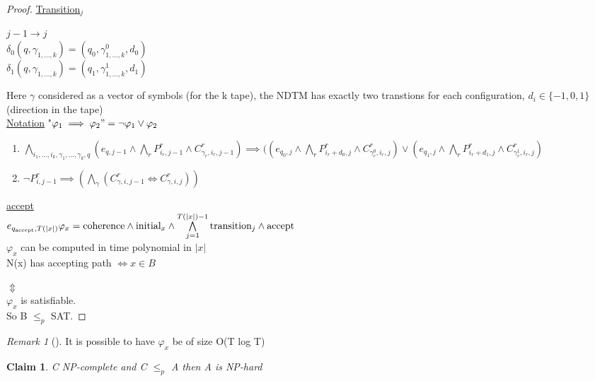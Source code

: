 \documentclass{article}
\newtheorem{claim}{Claim}
\theoremstyle{definition}
\theoremstyle{remark}
\newtheorem*{remark}{Remark}
\newcommand{\Rem}[3]{\begin{remark}[#1]\label{#2}#3\end{remark}}
\begin{document}
\begin{proof}
	\underline{Transition$_j$}
	
	$j-1 \rightarrow j$\\
	$\delta_0(q,\gamma_{1,\dots,k}) = (q_0,\gamma^0_{1,\dots,k},d_0)$\\
	$\delta_1(q,\gamma_{1,\dots,k}) = (q_1,\gamma^1_{1,\dots,k},d_1)$
	
	Here $\gamma$ considered as a vector of symbols (for the k tape), the NDTM has exactly two transtions for each configuration, $d_i \in \{-1,0,1\}$ (direction in the tape)\\
	
	\underline{Notation}
	"$\varphi_1 \implies \varphi_2" = \neg \varphi_1 \vee \varphi_2$\\
	
	\begin{enumerate}
		\item $\bigwedge\limits_{i_1,\dots,i_k,\gamma_1,\dots,\gamma_k,q}(e_{q,j-1}\wedge\bigwedge\limits_r P^r_{i_r,j-1} \wedge C^r_{\gamma_r,i_r,j-1}) \implies ((e_{q_0,j}\wedge\bigwedge\limits_r P^r_{i_r+d_0,j}\wedge C^r_{\gamma^0_r,i_r,j})\vee(e_{q_1,j}\wedge\bigwedge\limits_r P^r_{i_r+d_1,j}\wedge C^r_{\gamma^1_r,i_r,j})$
		\item $\neg P^r_{i,j-1} \implies (\bigwedge\limits_{\gamma}(C^r_{\gamma,i,j-1} \Longleftrightarrow C^r_{\gamma,i,j}))$
	\end{enumerate}
	
	\underline{accept}\\
	$e_{q_{\text{accept}},T(|x|)}\\
	\varphi_x = \text{coherence} \wedge \text{initial}_x \wedge \bigwedge\limits_{j=1}^{T(|x|)-1} \text{transition}_j\wedge\text{accept}$\\
	
	$\varphi_x$ can be computed in time polynomial in $|x|$\\
	N(x) has accepting path $\Longleftrightarrow x \in B$
	
	$\Updownarrow$\\
	$\varphi_x$ is satisfiable.\\
	
	So B $\leq_p$ SAT.
\end{proof}

\Rem{}{arg2}{It is possible to have $\varphi_x$ be of size O(T log T)}

\begin{claim}
	C NP-complete and C $\leq_p$ A then A is NP-hard
\end{claim}
\end{document}
